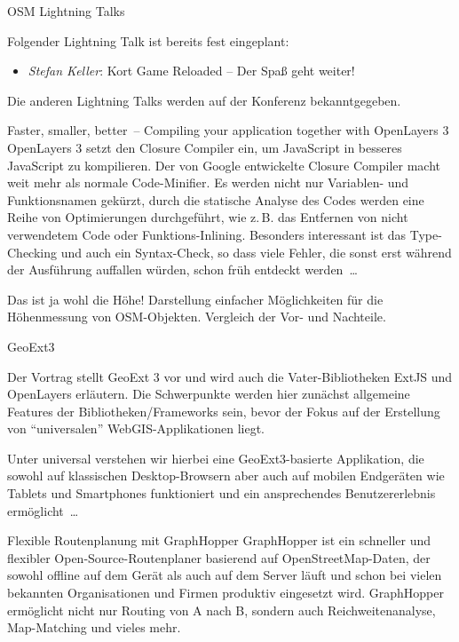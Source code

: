 \abstractGiStudio{}%
{OSM Lightning Talks}%
{}%
{Folgender Lightning Talk ist bereits fest eingeplant:
	\begin{itemize}
		\RaggedRight
		\setlength{\itemsep}{-2pt} %
		\item \emph{Stefan Keller}: Kort Game Reloaded -- Der Spaß geht weiter!
	\end{itemize}
	\justifying
Die anderen Lightning Talks werden auf der Konferenz bekanntgegeben.
}

%
{Faster, smaller, better~-- \mbox{Compiling} your application together with OpenLayers 3}%
{}%
{OpenLayers 3 setzt den Closure Compiler ein, um Java\-Script in besseres JavaScript zu kompilieren.
Der von Google entwickelte Closure Compiler macht weit mehr als normale Code-Minifier.
Es werden nicht nur Variablen- und Funk\-tionsnamen gekürzt, durch die statische Analyse
des Codes werden eine Reihe von Optimierungen durchgeführt, wie z.\,B. das Entfernen
von nicht verwendetem Code oder Funktions-Inlining. Besonders interessant ist das
Type-Checking und auch ein Syntax-Check, so dass viele Fehler, die sonst erst während
der Ausführung auffallen würden, schon früh entdeckt werden~\dots}

%
{Das ist ja wohl die Höhe!}%
{}%
{Darstellung einfacher Möglichkeiten für die Höhenmessung von OSM-Objekten. Vergleich der Vor- und Nachteile.}

%
{GeoExt3}%
{}%
{Der Vortrag stellt GeoExt 3 vor und wird auch die Vater-Bibliotheken ExtJS
und OpenLayers erläutern. Die Schwer\-punkte werden hier zunächst allgemeine
Features der Bibliotheken/Frameworks sein, bevor der Fokus auf der Erstellung
von "`universalen"' WebGIS-Applikationen liegt.

Unter universal verstehen wir
hierbei eine GeoExt3-basierte Applikation, die sowohl auf klassischen
Desktop-Browsern aber auch auf mobilen Endgeräten wie Tablets und Smartphones
funktioniert und ein ansprechendes Benutzererlebnis ermöglicht~\dots}

%
{Flexible Routenplanung mit \mbox{GraphHopper}}%
{}%
{GraphHopper ist ein schneller und flexibler Open-Source-Routenplaner basierend auf OpenStreetMap-Daten,
der sowohl offline auf dem Gerät als auch auf dem Server läuft und schon bei vielen bekannten Organisationen
und Firmen produktiv eingesetzt wird. GraphHopper ermöglicht nicht nur Routing von A nach B, sondern auch
Reichweitenanalyse, Map-Matching und vieles mehr.}

